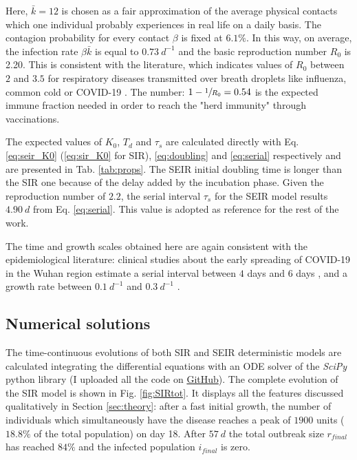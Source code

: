 \documentclass[DIV=12, BCOR=0pt]{scrartcl}  %
\begin{document}
  Here, $\bar{k} = 12$ is chosen as a fair approximation of the average physical contacts which one individual probably experiences in real life on a daily basis. The contagion probability for every contact $\beta$ is fixed at $6.1 \%$. In this way, on average, the infection rate $\beta \bar{k}$ is equal to $0.73 \ d^{-1}$ and the basic reproduction number $R_0$ is 2.20. This is consistent with the literature, which indicates values of $R_0$ between $2$ and $3.5$ for respiratory diseases transmitted over breath droplets like influenza, common cold or COVID-19 \citep{Hilton2020, Sanche2020, Firth2020}. 
  The number: $1 - \sfrac{1}{R_0} = 0.54 $ is the expected immune fraction needed in order to reach the "herd immunity" through vaccinations.
  
  The expected values of $K_0$, $T_d$ and $\tau_s$ are calculated directly with Eq. \ref{eq:seir_K0} (\ref{eq:sir_K0} for SIR), \ref{eq:doubling} and \ref{eq:serial} respectively and are presented in Tab. \ref{tab:props}. The SEIR initial doubling time is longer than the SIR one because of the delay added by the incubation phase. Given the reproduction number of $2.2$, the serial interval $\tau_s$ for the SEIR model results $4.90 \ d$ from Eq. \ref{eq:serial}. This value is adopted as reference for the rest of the work.
  
  The time and growth scales obtained here are again consistent with the epidemiological literature: clinical studies about the early spreading of COVID-19 in the Wuhan region estimate a serial interval between $4$ days \citep{Du2020} and $6$ days \citep{Firth2020}, and a growth rate between $0.1 \ d^{-1}$ \citep{Du2020} and $0.3 \ d^{-1}$ \citep{Sanche2020}.
    
  
  \subsection{Numerical solutions}
	The time-continuous evolutions of both SIR and SEIR deterministic models are calculated integrating the differential equations with an ODE solver of the \textit{SciPy} python library (I uploaded all the code on \href{https://github.com/giacom0rovers1/pyndemic}{GitHub}).
	The complete evolution of the SIR model is shown in Fig. \ref{fig:SIRtot}. It displays all the features discussed qualitatively in Section \ref{sec:theory}: after a fast initial growth, the number of individuals which simultaneously have the disease reaches a peak of $1900$ units ($18.8 \%$ of the total population) on day 18. After $57 \ d$ the total outbreak size $r_{final}$ has reached $84 \%$ and the infected population $i_{final}$ is zero.
	
\end{document}
